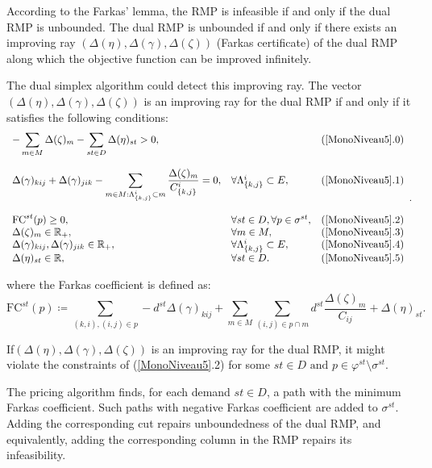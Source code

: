 According to the Farkas' lemma, the RMP is infeasible if and only if the dual RMP is unbounded. The dual RMP is unbounded if and only if there exists an improving ray \((\Delta(\eta), \Delta(\gamma), \Delta(\zeta))\) (Farkas certificate) of the dual RMP along which the objective function can be improved infinitely.
 
 The dual simplex algorithm could detect this improving ray. The vector \((\Delta(\eta), \Delta(\gamma), \Delta(\zeta))\) is an improving ray for the dual RMP if and only if it satisfies the following conditions:
 \begin{equation}\label{MonoNiveau5}
\begin{array}{llll}
 -  \displaystyle \sum_{m \in M} \Delta(\zeta)_m - \displaystyle  \sum_{st \in D}  \Delta(\eta)_{st}     > 0,      &&  (\ref{MonoNiveau5}.0)\\\\
\Delta(\gamma)_{kij} + \Delta(\gamma)_{jik} -   \displaystyle\sum_{m \in M: \Lambda^i_{\{k,j\}} \subset m} \frac{\Delta(\zeta)_m}{C^i_{\{k,j\}}} =  0,                  &  \forall   \Lambda^i_{\{k,j\}} \subset E, &(\ref{MonoNiveau5}.1)\\\\
\textrm{FC}^{st}(p)   \ge 0,   & \forall st \in D, \forall p \in \sigma^{st}, &(\ref{MonoNiveau5}.2)\\
\Delta(\zeta)_m \in  \mathbb{R}_{+},  &
\forall m \in M,
&(\ref{MonoNiveau5}.3)\\
\Delta(\gamma)_{kij},\Delta(\gamma)_{jik} \in \mathbb{R}_{+},  &  \forall    \Lambda^i_{\{k,j\}} \subset E, &(\ref{MonoNiveau5}.4)\\
\Delta(\eta)_{st} \in \mathbb{R},  & \forall st \in D. &(\ref{MonoNiveau5}.5)
\end{array}
.
\end{equation}

where the Farkas coefficient is defined as:
\begin{equation}
    \textrm{FC}^{st}(p)\coloneqq \sum_{(k,i),(i,j) \in p} -d^{st}\Delta(\gamma)_{kij} +\sum_{m \in M}\sum_{(i,j) \in p \cap m} d^{st}\frac{\Delta(\zeta)_{m}}{C_{ij}} + \Delta(\eta)_{st}.
\end{equation}
 
 
If\((\Delta(\eta), \Delta(\gamma),\Delta(\zeta))\) is an improving ray for the dual RMP, it might violate the constraints of (\ref{MonoNiveau5}.2) for some \(  st \in D \text{ and } p  \in \varphi^{st} \setminus \sigma^{st}\).

The pricing algorithm finds, for each demand \(st \in D\), a path with the minimum Farkas coefficient. Such paths with negative Farkas coefficient are added to \(\sigma^{st}\). Adding the corresponding cut repairs unboundedness of the  dual RMP, and equivalently, adding the corresponding column in the RMP repairs its infeasibility.

